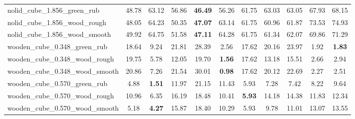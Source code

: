 \begin{table}[H]
{\begin{tabular}{l cccccccccc}
        nolid\_cube\_1.856\_green\_rub & 48.78 & 63.12 & 56.86 & \textbf{46.49} & 56.26 & 61.75 & 63.03 & 63.05 & 67.93 & 68.15 \\
        nolid\_cube\_1.856\_wood\_rough & 48.05 & 64.23 & 50.35 & \textbf{47.07} & 63.14 & 61.75 & 60.96 & 61.87 & 73.53 & 74.93 \\
        nolid\_cube\_1.856\_wood\_smooth & 49.92 & 64.75 & 51.58 & \textbf{47.11} & 64.28 & 61.75 & 61.34 & 62.07 & 69.86 & 71.29 \\
        wooden\_cube\_0.348\_green\_rub & 18.64 & 9.24 & 21.81 & 28.39 & 2.56 & 17.62 & 20.16 & 23.97 & 1.92 & \textbf{1.83} \\
        wooden\_cube\_0.348\_wood\_rough & 19.75 & 5.78 & 12.05 & 19.70 & \textbf{1.56} & 17.62 & 13.18 & 15.51 & 2.66 & 2.94 \\
        wooden\_cube\_0.348\_wood\_smooth & 20.86 & 7.26 & 21.54 & 30.01 & \textbf{0.98} & 17.62 & 20.12 & 22.69 & 2.27 & 2.51 \\
        wooden\_cube\_0.570\_green\_rub & 4.88 & \textbf{1.51} & 11.97 & 21.15 & 11.43 & 5.93 & 7.28 & 7.42 & 8.22 & 9.64 \\
        wooden\_cube\_0.570\_wood\_rough & 10.96 & 6.35 & 16.19 & 18.48 & 10.41 & \textbf{5.93} & 14.18 & 14.38 & 11.83 & 12.34 \\
        wooden\_cube\_0.570\_wood\_smooth & 5.18 & \textbf{4.27} & 15.87 & 18.40 & 10.29 & 5.93 & 9.78 & 11.01 & 13.07 & 13.55 \\
        \bottomrule
    \end{tabular}
    }
\end{table}



\vspace{1cm}

\clearpage

